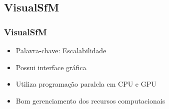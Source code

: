 \documentclass[table, usenames, svgnames, xcolor=dvipsnames]{beamer}
\begin{document}
%

\subsection{VisualSfM}

\begin{frame} 
\frametitle{\textbf{VisualSfM}}
	\begin{center}
		\begin{itemize}
			\item {Palavra-chave: Escalabilidade}
			\item {Possui interface gráfica}
			\item {Utiliza programação paralela em CPU e GPU}
			\item {Bom gerenciamento dos recursos computacionais}
		\end{itemize}
	\end{center}
\end{frame}

\end{document}
